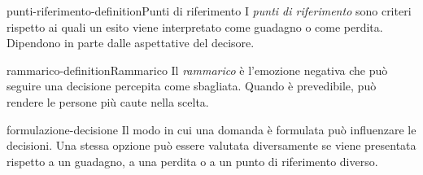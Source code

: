 \documentclass[preview]{standalone}
\begin{document}

\begin{snippetdefinition}{punti-riferimento-definition}{Punti di riferimento}
    I \emph{punti di riferimento} sono criteri rispetto ai quali un esito viene
    interpretato come guadagno o come perdita. Dipendono in parte dalle
    aspettative del decisore.
\end{snippetdefinition}

\begin{snippetdefinition}{rammarico-definition}{Rammarico}
    Il \emph{rammarico} è l'emozione negativa che può seguire una decisione
    percepita come sbagliata. Quando è prevedibile, può rendere le persone più
    caute nella scelta.
\end{snippetdefinition}

\begin{snippet}{formulazione-decisione}
    Il modo in cui una domanda è formulata può influenzare le decisioni. Una
    stessa opzione può essere valutata diversamente se viene presentata rispetto
    a un guadagno, a una perdita o a un punto di riferimento diverso.
\end{snippet}
\end{document}
